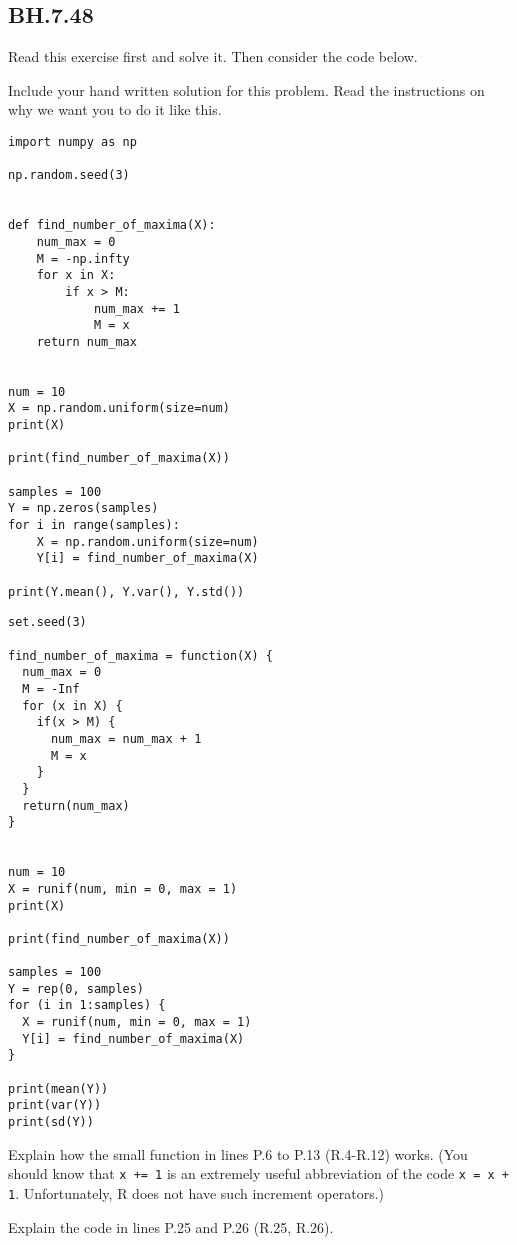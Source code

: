 \subsection{BH.7.48}

Read this exercise first and solve it. Then consider the code below.

\begin{exercise}
Include your hand written solution for this problem. Read the instructions on why we want you to do it like this.
\end{exercise}


\begin{verbatim}
import numpy as np

np.random.seed(3)


def find_number_of_maxima(X):
    num_max = 0
    M = -np.infty
    for x in X:
        if x > M:
            num_max += 1
            M = x
    return num_max


num = 10
X = np.random.uniform(size=num)
print(X)

print(find_number_of_maxima(X))

samples = 100
Y = np.zeros(samples)
for i in range(samples):
    X = np.random.uniform(size=num)
    Y[i] = find_number_of_maxima(X)

print(Y.mean(), Y.var(), Y.std())
\end{verbatim}


\begin{verbatim}
set.seed(3)

find_number_of_maxima = function(X) {
  num_max = 0
  M = -Inf
  for (x in X) {
    if(x > M) {
      num_max = num_max + 1
      M = x
    }
  }
  return(num_max)
}


num = 10
X = runif(num, min = 0, max = 1)
print(X)

print(find_number_of_maxima(X))

samples = 100
Y = rep(0, samples)
for (i in 1:samples) {
  X = runif(num, min = 0, max = 1)
  Y[i] = find_number_of_maxima(X)
}

print(mean(Y))
print(var(Y))
print(sd(Y))
\end{verbatim}

\begin{exercise}
Explain how the small function in lines P.6 to P.13 (R.4-R.12) works.
(You should know that \texttt{x += 1} is an extremely useful abbreviation of the code \texttt{x = x + 1}. Unfortunately, R does not have such increment operators.)
\end{exercise}

\begin{exercise}
Explain the code in lines P.25 and P.26 (R.25, R.26).
\end{exercise}
